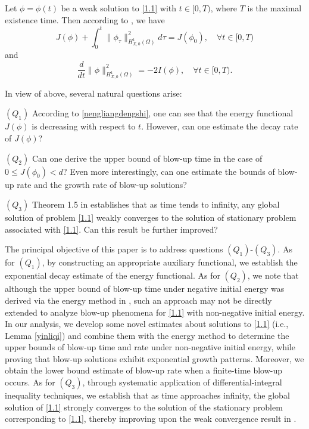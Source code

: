 \documentclass[11pt,a4paper]{article}
\numberwithin{equation}{section}
\numberwithin{remark}{section}
\begin{document}
Let $\phi=\phi(t)$ be a weak solution to \eqref{1.1} with $t\in[0,T)$, where $T$ is the maximal existence time. Then according to \cite{MR3961341}, we have
\begin{equation}\label{nengliangdengshi}
J(\phi)+\int_0^t\|\phi_\tau\|_{H_{X,0}^1(\Omega)}^2d\tau=J(\phi_0),\quad \forall t\in[0,T)
\end{equation}
and
\begin{equation}\label{Idengshi}
\frac{d}{dt}\|\phi\|_{H_{X,0}^1(\Omega)}^2=-2I(\phi),\quad \forall t\in[0,T).
\end{equation}



In view of above, several natural questions arise:
\begin{description}
  \item{$(Q_1)$} According to \eqref{nengliangdengshi}, one can see that the energy functional $J(\phi)$ is decreasing with respect to $t$. However, can one estimate the decay rate of $J(\phi)$?
  \item{$(Q_2)$} Can one derive the upper bound of blow-up time in the case of $0\leq J(\phi_0)<d$? Even more interestingly, can one estimate the bounds of blow-up rate and the growth rate of blow-up solutions?
  \item{$(Q_3)$} Theorem 1.5 in \cite{MR4854159} establishes that as time tends to infinity, any global solution of problem \eqref{1.1} weakly converges to the solution of stationary problem associated with \eqref{1.1}. Can this result be further improved?
\end{description}

The principal objective of this paper is to address questions $(Q_1)$-$(Q_3)$.
As for $(Q_1)$, by constructing an appropriate auxiliary functional, we establish the exponential decay estimate of the energy functional.
As for $(Q_2)$, we note that although the upper bound of blow-up time under negative initial energy was derived via the energy method in \cite{MR4854159}, such an approach may not be directly extended to analyze blow-up phenomena for \eqref{1.1} with non-negative initial energy. In our analysis, we develop some novel estimates about solutions to \eqref{1.1} (i.e., Lemma \ref{yinliqi}) and combine them with the energy method to determine the upper bounds of blow-up time and rate under non-negative initial energy, while proving that blow-up solutions exhibit exponential growth patterns. Moreover, we obtain the lower bound estimate of blow-up rate when a finite-time blow-up occurs.
As for $(Q_3)$, through systematic application of differential-integral inequality techniques, we establish that as time approaches infinity, the global solution of \eqref{1.1} strongly converges to the solution of the stationary problem corresponding to \eqref{1.1}, thereby improving upon the weak convergence result in \cite{MR4854159}.
\end{document}

